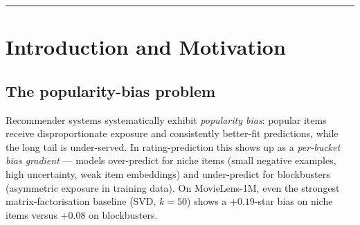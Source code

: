 \documentclass[11pt,a4paper]{article}
\begin{document}
\begin{abstract}
\paragraph{Secondary (accuracy) result.} Crucially, this bias reduction
does \emph{not} sacrifice accuracy: CFv2 retr-14B+cal reaches
RMSE~$0.903$ --- within $0.3\%$ of ItemKNN ($0.901$) and beating every
other LLM-only method. A 17-feature Ridge stacker that combines the
counterfactual LLM predictions with CF models reaches RMSE~$0.876$,
closing 76\% of the oracle gap.

\paragraph{Negative findings} that shape the design: TIPS
time-awareness is null on 3-year spans; the 3-stage causal scaffolding
is not itself the active debiasing mechanism (bounded-delta and
calibration are); un-anchored LLM prompting strategies (logprob decoding,
soft-distribution, preference CoT) all increase bias relative to
CFv2+cal; LLM-as-meta-learner (confidence router) is worse than a fixed
Ridge blend.

\paragraph{Takeaway.} Popularity-bias mitigation is a separable
objective in which \emph{counterfactual LLM reasoning genuinely excels},
even though pure accuracy remains CF's strength. For a production system
that values fairness as well as RMSE, the CFv2+cal family is the
\emph{only} configuration that both reduces bias by $>$96\% and keeps
RMSE within 0.5\% of the best CF baseline.
\end{abstract}

\tableofcontents
\vspace{1em}\hrule\vspace{1em}

\section{Introduction and Motivation}

\subsection{The popularity-bias problem}

Recommender systems systematically exhibit \emph{popularity bias}: popular
items receive disproportionate exposure and consistently better-fit
predictions, while the long tail is under-served. In rating-prediction
this shows up as a \emph{per-bucket bias gradient} --- models over-predict
for niche items (small negative examples, high uncertainty, weak item
embeddings) and under-predict for blockbusters (asymmetric exposure in
training data). On MovieLens-1M, even the strongest matrix-factorisation
baseline (SVD, $k{=}50$) shows a $+0.19$-star bias on niche items versus
$+0.08$ on blockbusters.
\end{document}
